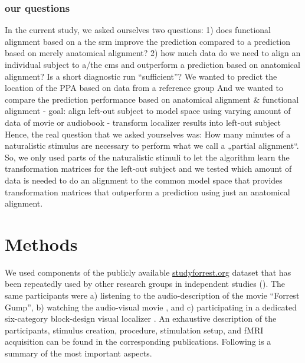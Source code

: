 \subsubsection{our questions}
In the current study, we asked ourselves two questions:
%
1) does functional alignment based on a the \ac{srm} improve the prediction
compared to a prediction based on merely anatomical alignment?
%
2) how much data do we need to align an individual subject to a/the \ac{cms} and
outperform a prediction based on anatomical alignment? Is a short diagnostic run
``sufficient''?
%
We wanted to predict the location of the PPA based on data from a reference
group
%
And we wanted to compare the prediction performance based on anatomical
alignment \& functional alignment
%
- goal: align left-out subject to model space using varying amount of data of
movie or audiobook - transform localizer results into left-out subject
%
Hence, the real question that we asked yourselves was: How many minutes of a
naturalistic stimulus are necessary to perform what we call a „partial
alignment“.
%
So, we only used parts of the naturalistic stimuli to let the algorithm learn
the transformation matrices for the left-out subject
%
and we tested which amount of data is needed to do an alignment to the common
model space that provides transformation matrices that outperform a prediction
using just an anatomical alignment.


\section{Methods}


We used components of the publicly available
\href{http://www.studyforrest.org}{studyforrest.org} dataset that has
been repeatedly used by other research groups in independent studies
(\citep[e.g.,][]{ben2018hippocampal, jiahui2019predicting, hu2017decoding,
lettieri2019emotionotopy, nguyen2016integration}).
The same participants were
a) listening to the audio-description \citep{hanke2014audiomovie} of
the movie ``Forrest Gump'',
b) watching the audio-visual movie \citep{hanke2016simultaneous}, and
c) participating in a dedicated six-category block-design visual localizer
\citep{sengupta2016extension}.
An exhaustive description of the participants, stimulus creation, procedure,
stimulation setup, and fMRI acquisition can be found in the corresponding
publications. Following is a summary of the most important aspects.


